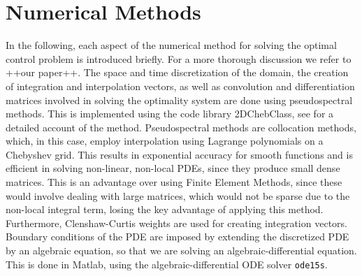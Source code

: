 \documentclass[final]{siamltex}
\begin{document}
\section{Numerical Methods}\label{sec:Methods}
In the following, each aspect of the numerical method for solving the optimal control problem is introduced briefly. For a more thorough discussion we refer to ++our paper++. 
The space and time discretization of the domain, the creation of integration and interpolation vectors, as well as convolution and differentiation matrices involved in solving the optimality system are done using pseudospectral methods. This is implemented using the code library 2DChebClass, see \cite{GoddardPseudospectralCode1} for a detailed account of the method. Pseudospectral methods are collocation methods, which, in this case, employ interpolation using Lagrange polynomials on a Chebyshev grid. This results in exponential accuracy for smooth functions and is efficient in solving non-linear, non-local PDEs, since they produce small dense matrices. This is an advantage over using Finite Element Methods, since these would involve dealing with large matrices, which would not be sparse due to the non-local integral term, losing the key advantage of applying this method. Furthermore, Clenshaw-Curtis weights are used for creating integration vectors. 
Boundary conditions of the PDE are imposed by extending the discretized PDE by an algebraic equation, so that we are solving an algebraic-differential equation. This is done in {Matlab}, using the algebraic-differential ODE solver \texttt{ode15s}. 
\end{document}
